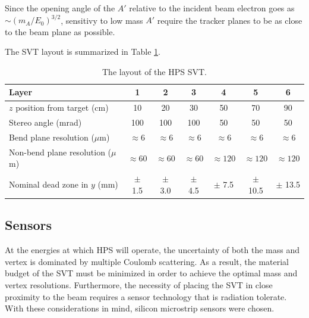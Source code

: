 Since the opening angle of the $A'$ relative to the incident beam electron goes
as $\sim (m_{A}/E_{0})^{3/2}$, sensitivy to low mass $A'$ require the tracker
planes to be as close to the beam plane as possible.


The SVT layout is summarized in Table \ref{tab:svt_layout}.

\begin{table}[t]
 \begin{center}
\begin{tabular}{l|cccccc}  
\hline
Layer & 1 & 2 & 3 & 4 & 5 & 6 \\ \hline
$z$ position from target (cm)    & 10 & 20 & 30 & 50 & 70 & 90 \\
Stereo angle (mrad) & 100 & 100 & 100 & 50 & 50 & 50 \\
Bend plane resolution ($\mu$m) & $\approx$6 & $\approx$6 & $\approx$6 & $\approx$6 & $\approx$6 & $\approx$6 \\
Non-bend plane resolution ($\mu$m) & $\approx60$ & $\approx60$ & $\approx60$ & $\approx120$ & $\approx120$ & $\approx120$ \\
Nominal dead zone in $y$ (mm) & $\pm$ 1.5 & $\pm$ 3.0 & $\pm$ 4.5 & $\pm$ 7.5 & $\pm$ 10.5 & $\pm$ 13.5 \\ 
\hline
\end{tabular}
\caption{The layout of the HPS SVT.}
\label{tab:svt_layout}
\end{center}
\end{table}




\subsection*{Sensors}

At the energies at which HPS will operate, the uncertainty of both the mass and
vertex is dominated by multiple Coulomb scattering.  As a result, 
the material budget of the SVT must be minimized in order to achieve the 
optimal mass and vertex resolutions.  Furthermore, the necessity of placing the
SVT in close proximity to the beam requires a sensor technology that is 
radiation tolerate.  With these considerations in mind, silicon microstrip 
sensors were chosen.

